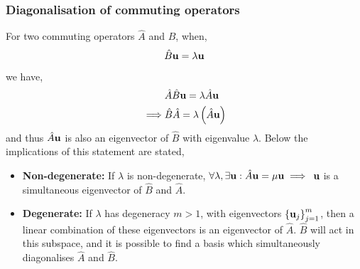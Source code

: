 \documentclass{book}
\begin{document}
\subsubsection{Diagonalisation of commuting operators}
For two commuting operators $\hat{A}$ and $\hat{B}$, when,
\begin{equation}
	\hat{B} \vb{u} = \lambda \vb{u}
\end{equation}
we have,
\begin{equation}
	\begin{split}
		& \hat{A}\hat{B}\vb{u} = \lambda\hat{A}\vb{u} \\
		\implies & \hat{B}\hat{A} = \lambda \left(\hat{A}\vb{u}\right)
	\end{split}
\end{equation}
and thus $\hat{A}\vb{u}$ is also an eigenvector of $\hat{B}$ with eigenvalue $\lambda$. Below the implications of this statement are stated,
\begin{itemize}
	\item \textbf{Non-degenerate:} If $\lambda$ is non-degenerate, $\forall\lambda, \exists\vb{u} : \hat{A}\vb{u} = \mu\vb{u} \implies$ $\vb{u}$ is a simultaneous eigenvector of $\hat{B}$ and $\hat{A}$.
	\item \textbf{Degenerate:} If $\lambda$ has degeneracy $m > 1$, with eigenvectors $\left\{\vb{u}_j\right\}_{j=1}^m$, then a linear combination of these eigenvectors is an eigenvector of $\hat{A}$. $\hat{B}$ will act in this subspace, and it is possible to find a basis which simultaneously diagonalises $\hat{A}$ and $\hat{B}$.
\end{itemize}
\end{document}
